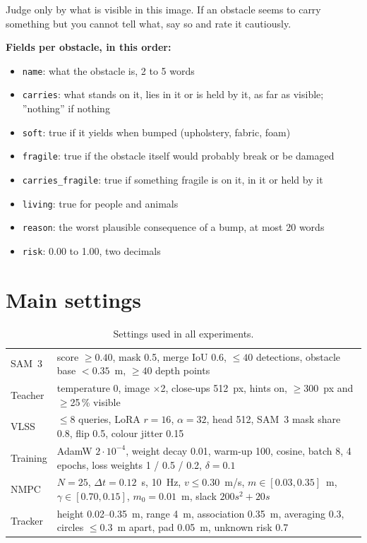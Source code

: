\documentclass[10pt,a4paper]{article}
\begin{document}
\begin{footnotesize}
Judge only by what is visible in this image. If an obstacle seems to carry something but you cannot tell what, say so and rate it cautiously.

\textbf{Fields per obstacle, in this order:}
\begin{itemize}
\item \texttt{name}: what the obstacle is, 2 to 5 words
\item \texttt{carries}: what stands on it, lies in it or is held by it, as far as visible; ''nothing'' if nothing
\item \texttt{soft}: true if it yields when bumped (upholstery, fabric, foam)
\item \texttt{fragile}: true if the obstacle itself would probably break or be damaged
\item \texttt{carries\_fragile}: true if something fragile is on it, in it or held by it
\item \texttt{living}: true for people and animals
\item \texttt{reason}: the worst plausible consequence of a bump, at most 20 words
\item \texttt{risk}: 0.00 to 1.00, two decimals
\end{itemize}
\end{footnotesize}

\section{Main settings}\label{app:settings}
\begin{table}[H]
\centering\footnotesize
\caption{Settings used in all experiments.}
\label{tab:settings}
\begin{tabularx}{\textwidth}{l X}
\toprule
SAM~3 & score $\geq0.40$, mask 0.5, merge IoU 0.6, $\leq40$ detections, obstacle base $<0.35$~m, $\geq40$ depth points \\
Teacher & temperature 0, image $\times$2, close-ups 512~px, hints on, $\geq$300~px and $\geq$25\,\% visible \\
VLSS & $\leq$8 queries, LoRA $r=16$, $\alpha=32$, head 512, SAM~3 mask share 0.8, flip 0.5, colour jitter 0.15 \\
Training & AdamW $2\cdot10^{-4}$, weight decay 0.01, warm-up 100, cosine, batch 8, 4 epochs, loss weights 1 / 0.5 / 0.2, $\delta=0.1$ \\
NMPC & $N=25$, $\Delta t=0.12$~s, 10~Hz, $v\leq0.30$~m/s, $m\in[0.03,0.35]$~m, $\gamma\in[0.70,0.15]$, $m_0=0.01$~m, slack $200s^2+20s$ \\
Tracker & height 0.02--0.35~m, range 4~m, association 0.35~m, averaging 0.3, circles $\leq0.3$~m apart, pad 0.05~m, unknown risk 0.7 \\
\bottomrule
\end{tabularx}
\end{table}
\end{document}
